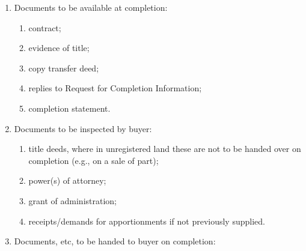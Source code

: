 \documentclass[
]{article}
\providecommand{\tightlist}{%
  \setlength{\itemsep}{0pt}\setlength{\parskip}{0pt}}
\begin{document}
\begin{enumerate}
\def\labelenumi{\arabic{enumi}.}
\tightlist
\item
  Documents to be available at completion:

  \begin{enumerate}
  \def\labelenumii{(\alph{enumii})}
  \tightlist
  \item
    contract;\\
  \item
    evidence of title;\\
  \item
    copy transfer deed;\\
  \item
    replies to Request for Completion Information;\\
  \item
    completion statement.
  \end{enumerate}
\item
  Documents to be inspected by buyer:

  \begin{enumerate}
  \def\labelenumii{(\alph{enumii})}
  \tightlist
  \item
    title deeds, where in unregistered land these are not to be handed
    over on\\
    completion (e.g., on a sale of part);\\
  \item
    power(s) of attorney;\\
  \item
    grant of administration;\\
  \item
    receipts/demands for apportionments if not previously supplied.
  \end{enumerate}
\item
  Documents, etc, to be handed to buyer on completion:


\end{enumerate}
\end{document}
